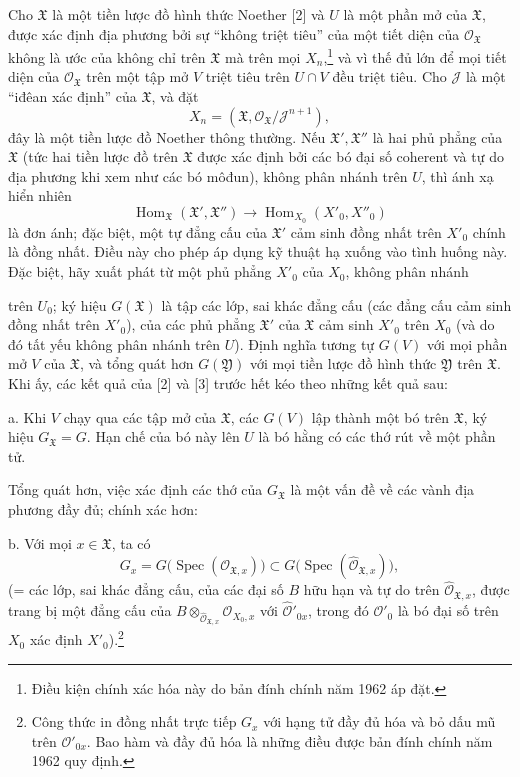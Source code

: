 Cho $\mathfrak X$ là một tiền lược đồ hình thức Noether [2] và $U$ là một
phần mở của $\mathfrak X$, được xác định địa phương bởi sự ``không triệt tiêu''
của một tiết diện của $\mathcal O_{\mathfrak X}$ không là ước của không chỉ
trên $\mathfrak X$ mà trên mọi $X_n$,\footnote{Điều kiện chính xác hóa này do
bản đính chính năm 1962 áp đặt.} và vì thế đủ lớn để mọi tiết diện của
$\mathcal O_{\mathfrak X}$ trên một tập mở $V$ triệt tiêu trên $U\cap V$ đều
triệt tiêu. Cho $\mathcal J$ là một ``iđêan xác định'' của $\mathfrak X$, và
đặt
\[
  X_n=(\mathfrak X,\mathcal O_{\mathfrak X}/\mathcal J^{n+1}),
\]
đây là một tiền lược đồ Noether thông thường. Nếu
$\mathfrak X',\mathfrak X''$ là hai phủ phẳng của $\mathfrak X$ (tức hai tiền
lược đồ trên $\mathfrak X$ được xác định bởi các bó đại số coherent và tự do
địa phương khi xem như các bó môđun), không phân nhánh trên $U$, thì ánh xạ
hiển nhiên
\[
  \operatorname{Hom}_{\mathfrak X}(\mathfrak X',\mathfrak X'')
  \longrightarrow
  \operatorname{Hom}_{X_0}(X'_0,X''_0)
\]
là đơn ánh; đặc biệt, một tự đẳng cấu của $\mathfrak X'$ cảm sinh đồng nhất
trên $X'_0$ chính là đồng nhất. Điều này cho phép áp dụng kỹ thuật hạ xuống vào
tình huống này. Đặc biệt, hãy xuất phát từ một phủ phẳng $X'_0$ của $X_0$,
không phân nhánh

trên $U_0$; ký hiệu $G(\mathfrak X)$ là tập các lớp, sai khác đẳng cấu (các
đẳng cấu cảm sinh đồng nhất trên $X'_0$), của các phủ phẳng $\mathfrak X'$ của
$\mathfrak X$ cảm sinh $X'_0$ trên $X_0$ (và do đó tất yếu không phân nhánh
trên $U$). Định nghĩa tương tự $G(V)$ với mọi phần mở $V$ của $\mathfrak X$,
và tổng quát hơn $G(\mathfrak Y)$ với mọi tiền lược đồ hình thức
$\mathfrak Y$ trên $\mathfrak X$. Khi ấy, các kết quả của [2] và [3] trước hết
kéo theo những kết quả sau:

\noindent a. Khi $V$ chạy qua các tập mở của $\mathfrak X$, các $G(V)$ lập
thành một bó trên $\mathfrak X$, ký hiệu $G_{\mathfrak X}=G$. Hạn chế của bó
này lên $U$ là bó hằng có các thớ rút về một phần tử.

Tổng quát hơn, việc xác định các thớ của $G_{\mathfrak X}$ là một vấn đề về
các vành địa phương đầy đủ; chính xác hơn:

\noindent b. Với mọi $x\in\mathfrak X$, ta có
\[
  G_x=G\bigl(\operatorname{Spec}(\mathcal O_{\mathfrak X,x})\bigr)
  \subset
  G\bigl(\operatorname{Spec}(\widehat{\mathcal O}_{\mathfrak X,x})\bigr),
\]
(= các lớp, sai khác đẳng cấu, của các đại số $B$ hữu hạn và tự do trên
$\widehat{\mathcal O}_{\mathfrak X,x}$, được trang bị một đẳng cấu của
$B\otimes_{\widehat{\mathcal O}_{\mathfrak X,x}}\mathcal O_{X_0,x}$ với
$\widehat{\mathcal O}'_{0x}$, trong đó $\mathcal O'_0$ là bó đại số trên
$X_0$ xác định $X'_0$).\footnote{Công thức in đồng nhất trực tiếp $G_x$ với
hạng tử đầy đủ hóa và bỏ dấu mũ trên $\mathcal O'_{0x}$. Bao hàm và đầy đủ hóa
là những điều được bản đính chính năm 1962 quy định.}

